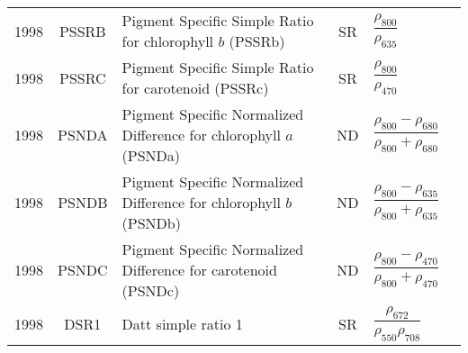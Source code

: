 \documentclass[10pt]{article}
\begin{document}
\begin{ThreePartTable}
\begin{longtable}{c c m{2.3in} c M{2.8in} M{1.5in}}
  1998 & PSSRB   & Pigment Specific Simple Ratio for chlorophyll $b$ (PSSRb)                      & SR & $\dfrac{\rho_{800}}{\rho_{635}}$                                                                                                                                                                                                                                                        & \citet{Blackburn1998a,Blackburn1998b}               \\
  1998 & PSSRC   & Pigment Specific Simple Ratio for carotenoid (PSSRc)                           & SR & $\dfrac{\rho_{800}}{\rho_{470}}$                                                                                                                                                                                                                                                        & \citet{Blackburn1998a,Blackburn1998b}               \\
  1998 & PSNDA   & Pigment Specific Normalized Difference for chlorophyll $a$ (PSNDa)             & ND & $\dfrac{\rho_{800}-\rho_{680}}{\rho_{800}+\rho_{680}}$                                                                                                                                                                                                                                  & \citet{Blackburn1998a,Blackburn1998b}               \\
  1998 & PSNDB   & Pigment Specific Normalized Difference for chlorophyll $b$ (PSNDb)             & ND & $\dfrac{\rho_{800}-\rho_{635}}{\rho_{800}+\rho_{635}}$                                                                                                                                                                                                                                  & \citet{Blackburn1998a,Blackburn1998b}               \\
  1998 & PSNDC   & Pigment Specific Normalized Difference for carotenoid (PSNDc)                  & ND & $\dfrac{\rho_{800}-\rho_{470}}{\rho_{800}+\rho_{470}}$                                                                                                                                                                                                                                  & \citet{Blackburn1998a,Blackburn1998b}               \\
  1998 & DSR1    & Datt simple ratio 1                                                            & SR & $\dfrac{\rho_{672}}{\rho_{550}\rho_{708}}$                                                                                                                                                                                                                                              & \citet{Datt1998}                                    \\

\end{longtable}
\end{ThreePartTable}
\end{document}
